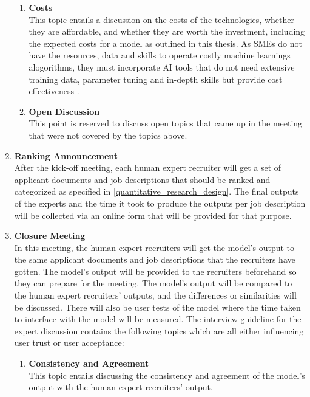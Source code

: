 \documentclass[draft,final]{thesisclass} %
\begin{document}
\begin{enumerate}
\begin{enumerate}
        \item \textbf{Costs} \parencite{cost_ml_sme}\\
        This topic entails a discussion on the costs of the technologies, whether they are affordable, and whether they are worth the investment, including the expected costs for a model as outlined in this thesis. As \acs{SMEs} do not have the resources, data and skills to operate costly machine learnings alogorithms, they must incorporate \acs{AI} tools that do not need extensive training data, parameter tuning and in-depth skills but provide cost effectiveness \parencite[1]{cost_ml_sme}.
        \item \textbf{Open Discussion}\\
        This point is reserved to discuss open topics that came up in the meeting that were not covered by the topics above.
    \end{enumerate}
    \item \textbf{Ranking Announcement} \label{ranking_announcement}\\
    After the kick-off meeting, each human expert recruiter will get a set of applicant documents and job descriptions that should be ranked and categorized as specified in \ref{quantitative_research_design}.
    The final outputs of the experts and the time it took to produce the outputs per job description will be collected via an online form that will be provided for that purpose.
    \item \textbf{Closure Meeting} \label{closure_meeting}\\
    In this meeting, the human expert recruiters will get the model's output to the same applicant documents and job descriptions that the recruiters have gotten.
    The model's output will be provided to the recruiters beforehand so they can prepare for the meeting.
    The model's output will be compared to the human expert recruiters' outputs, and the differences or similarities will be discussed.
    There will also be user tests of the model where the time taken to interface with the model will be measured.
    The interview guideline for the expert discussion contains the following topics which are all either influencing user trust or user acceptance:
    \begin{enumerate}
        \item \textbf{Consistency and Agreement} \parencite{accuracy_user_trust}\\
        This topic entails discussing the consistency and agreement of the model's output with the human expert recruiters' output.

\end{enumerate}
\end{enumerate}
\end{document}
